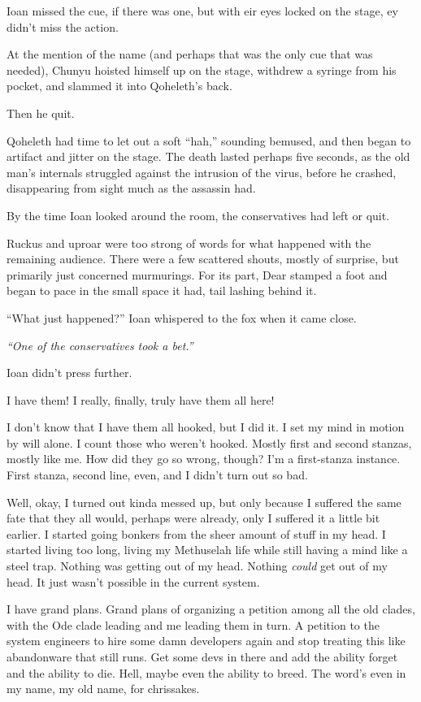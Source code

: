Ioan missed the cue, if there was one, but with eir eyes locked on the stage, ey didn't miss the action.

At the mention of the name (and perhaps that was the only cue that was needed), Chunyu hoisted himself up on the stage, withdrew a syringe from his pocket, and slammed it into Qoheleth's back.

Then he quit.

Qoheleth had time to let out a soft ``hah,'' sounding bemused, and then began to artifact and jitter on the stage. The death lasted perhaps five seconds, as the old man's internals struggled against the intrusion of the virus, before he crashed, disappearing from sight much as the assassin had.

By the time Ioan looked around the room, the conservatives had left or quit.

Ruckus and uproar were too strong of words for what happened with the remaining audience. There were a few scattered shouts, mostly of surprise, but primarily just concerned murmurings. For its part, Dear stamped a foot and began to pace in the small space it had, tail lashing behind it.

``What just happened?'' Ioan whispered to the fox when it came close.

\emph{``One of the conservatives took a bet.''}

Ioan didn't press further.

\secdiv{}

\noindent I have them! I really, finally, truly have them all here!

I don't know that I have them all hooked, but I did it. I set my mind in motion by will alone. I count those who weren't hooked. Mostly first and second stanzas, mostly like me. How did they go so wrong, though? I'm a first-stanza instance. First stanza, second line, even, and I didn't turn out so bad.

Well, okay, I turned out kinda messed up, but only because I suffered the same fate that they all would, perhaps were already, only I suffered it a little bit earlier. I started going bonkers from the sheer amount of stuff in my head. I started living too long, living my Methuselah life while still having a mind like a steel trap. Nothing was getting out of my head. Nothing \emph{could} get out of my head. It just wasn't possible in the current system.

I have grand plans. Grand plans of organizing a petition among all the old clades, with the Ode clade leading and me leading them in turn. A petition to the system engineers to hire some damn developers again and stop treating this like abandonware that still runs. Get some devs in there and add the ability forget and the ability to die. Hell, maybe even the ability to breed. The word's even in my name, my old name, for chrissakes.

